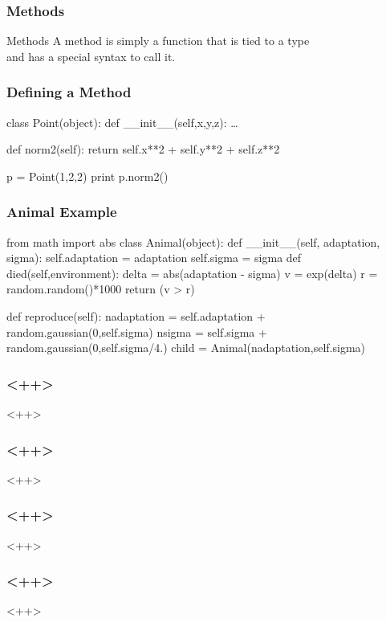 \begin{frame}[fragile] %
\frametitle{Methods}
\begin{block}{Methods}
A \alert{method} is simply a function that is tied to a type\\
and has a special syntax to call it.
\end{block}
\end{frame}

\begin{frame}[fragile] %
\frametitle{Defining a Method}
\begin{block}
class Point(object):
    def __init__(self,x,y,z):
        \ldots

    def norm2(self):
        return self.x**2 + self.y**2 + self.z**2

p = Point(1,2,2)
print p.norm2()
\end{block}
\end{frame}

\begin{frame}[fragile] %
\frametitle{Animal Example}
\begin{python}
from math import abs
class Animal(object):
    def __init__(self, adaptation, sigma):
        self.adaptation = adaptation
        self.sigma = sigma
    def died(self,environment):
        delta = abs(adaptation - sigma)
        v = exp(delta)
        r = random.random()*1000
        return (v > r)

    def reproduce(self):
        nadaptation = self.adaptation + random.gaussian(0,self.sigma)
        nsigma = self.sigma + random.gaussian(0,self.sigma/4.)
        child = Animal(nadaptation,self.sigma)
\end{python}
\end{frame}

\begin{frame}[fragile] %
\frametitle{<++>}
<++>
\end{frame}

\begin{frame}[fragile] %
\frametitle{<++>}
<++>
\end{frame}

\begin{frame}[fragile] %
\frametitle{<++>}
<++>
\end{frame}

\begin{frame}[fragile] %
\frametitle{<++>}
<++>
\end{frame}

